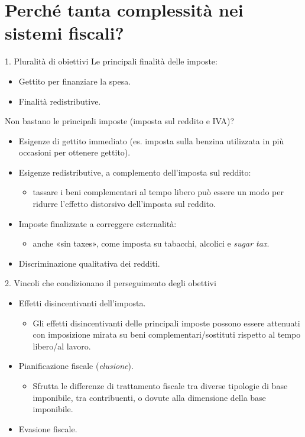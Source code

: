 \documentclass[aspectratio=64,12pt]{beamer}
\begin{document}
\section{Perché tanta complessità nei sistemi fiscali?}




\begin{frame}{1. Pluralità di obiettivi}
Le principali finalità delle imposte:
\begin{itemize}
\item Gettito per finanziare la spesa.
\item Finalità redistributive.
\end{itemize}
Non bastano le principali imposte (imposta sul reddito e IVA)?
\begin{itemize}
\item Esigenze di gettito immediato (es. imposta sulla benzina utilizzata in più
occasioni per ottenere gettito).
\item Esigenze redistributive, a complemento dell'imposta sul reddito:
\begin{itemize}
\item tassare i beni complementari al tempo libero può essere un modo per
ridurre l'effetto distorsivo dell'imposta sul reddito.
\end{itemize}
\item Imposte finalizzate a correggere esternalità:
\begin{itemize}
\item anche «sin taxes», come imposta su tabacchi, alcolici e \emph{sugar tax}.
\end{itemize}
\item Discriminazione qualitativa dei redditi.
\end{itemize}
\end{frame}

\begin{frame}{2. Vincoli che condizionano il perseguimento degli obettivi}
  \begin{resize}{1.2}
    \begin{itemize}
\item Effetti disincentivanti dell'imposta.
\begin{itemize}
\item Gli effetti disincentivanti delle principali imposte
possono essere attenuati con imposizione mirata su beni
complementari/sostituti rispetto al tempo libero/al lavoro.
\end{itemize}
\item Pianificazione fiscale (\emph{elusione}).
\begin{itemize}
\item Sfrutta le differenze di trattamento fiscale tra diverse tipologie di base
imponibile, tra contribuenti, o dovute alla dimensione della base
imponibile.
\end{itemize}
\item Evasione fiscale.
\end{itemize}
\end{resize}
\end{frame}
\end{document}
